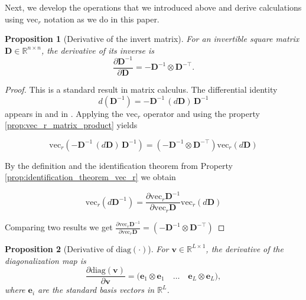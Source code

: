 \documentclass{article}
\newtheorem{proposition}{Proposition}
\begin{document}
Next, we develop the operations that we introduced above and derive calculations using $\mathrm{\text{vec}}_r$ notation as we do in this paper.

\begin{proposition} [Derivative of the invert matrix] \label{prop:invert_derivative}
For an invertible square matrix $\mathbf{D} \in \mathbb{R}^{n \times n}$, the derivative of its inverse is
\[
    \frac{\partial \mathbf{D}^{-1}}{\partial \mathbf{D}} 
    = -\mathbf{D}^{-1} \otimes \mathbf{D}^{-\top}.
\]
\end{proposition}

\begin{proof}
This is a standard result in matrix calculus. The differential identity 
\[
    d(\mathbf{D}^{-1}) = -\mathbf{D}^{-1} \,(d\mathbf{D})\, \mathbf{D}^{-1}
\]
appears in \cite{petersen2012matrix} and in \cite{magnus1988matrix}.  
Applying the $\mathrm{vec}_r$ operator and using the property \ref{prop:vec_r_matrix_product} yields 

\[
\mathrm{vec}_r(-\mathbf{D}^{-1} \,(d\mathbf{D})\, \mathbf{D}^{-1}) = (-\mathbf{D}^{-1} \otimes \mathbf{D}^{-\top}) \mathrm{vec}_r(d\mathbf{D})
\]

By the definition and the identification theorem from Property \ref{prop:identification_theorem_vec_r} we obtain

\[
\mathrm{vec}_r(d\mathbf{D}^{-1}) = \frac{\partial \mathrm{vec}_r \mathbf{D}^{-1}}{\partial\mathrm{vec}_r\mathbf{D}} \mathrm{vec}_r(d\mathbf{D})
\]

Comparing two results we get $\frac{\partial \mathrm{vec}_r \mathbf{D}^{-1}}{\partial\mathrm{vec}_r\mathbf{D}} = (-\mathbf{D}^{-1} \otimes \mathbf{D}^{-\top})$

\end{proof}

\begin{proposition}[Derivative of $\mathrm{diag}(\cdot)$] \label{prop:diag_derivative}
For $\mathbf{v} \in \mathbb{R}^{L \times 1}$, the derivative of the diagonalization map is
\[
    \frac{\partial \mathrm{diag}(\mathbf{v})}{\partial \mathbf{v}}
    = \big(\mathbf{e}_1 \otimes \mathbf{e}_1 \quad \dots \quad \mathbf{e}_L \otimes \mathbf{e}_L\big),
\]
where $\mathbf{e}_i$ are the standard basis vectors in $\mathbb{R}^L$.
\end{proposition}
\end{document}
